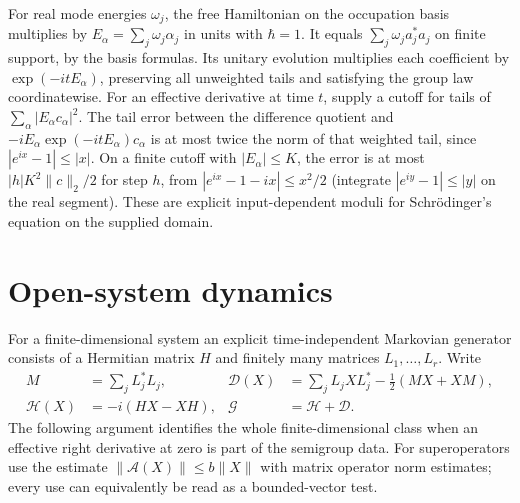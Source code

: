 For real mode energies \(\omega_j\), the free Hamiltonian on the
occupation basis multiplies by \(E_\alpha=\sum_j\omega_j\alpha_j\)
in units with \(\hbar=1\). It equals
\(\sum_j\omega_j a_j^*a_j\) on finite support, by the basis formulas.
Its unitary evolution multiplies each coefficient by
\(\exp(-itE_\alpha)\), preserving all unweighted tails and satisfying
the group law coordinatewise. For an effective derivative at time
\(t\), supply a cutoff for tails of
\(\sum_\alpha |E_\alpha c_\alpha|^2\). The tail error between the
difference quotient and \(-iE_\alpha\exp(-itE_\alpha)c_\alpha\) is at
most twice the norm of that weighted tail, since
\(|e^{ix}-1|\le |x|\). On a finite cutoff with \(|E_\alpha|\le K\),
the error is at most \(|h|K^2\|c\|_2/2\) for step \(h\), from
\(|e^{ix}-1-ix|\le x^2/2\) (integrate \(|e^{iy}-1|\le |y|\) on the
real segment). These are explicit input-dependent moduli for
Schr\"odinger's equation on the supplied domain.

\section{Open-system dynamics}
\label{sec:q-open}

For a finite-dimensional system an explicit time-independent
Markovian generator consists of a Hermitian matrix \(H\) and finitely
many matrices \(L_1,\ldots,L_r\). Write
\[
 \begin{aligned}
 M&=\sum_j L_j^*L_j, & \mathcal D(X)&=\sum_j L_jXL_j^*-\tfrac12(MX+XM),\\
 \mathcal H(X)&=-i(HX-XH), & \mathcal G&=\mathcal H+\mathcal D.
 \end{aligned}
\]
The following argument identifies the whole finite-dimensional class
when an effective right derivative at zero is part of the semigroup
data. For superoperators use the estimate
\(\|\mathcal A(X)\|\le b\|X\|\) with matrix operator norm estimates;
every use can equivalently be read as a bounded-vector test.

